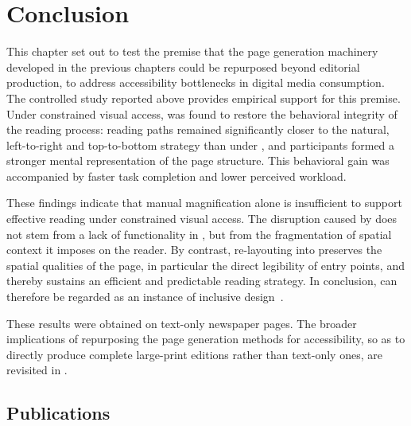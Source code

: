 










\section{Conclusion}

This chapter set out to test the premise that the page generation machinery developed in the previous chapters could be repurposed beyond editorial production, to address accessibility bottlenecks in digital media consumption. The controlled study reported above provides empirical support for this premise. Under constrained visual access, \condtwonot was found to restore the behavioral integrity of the reading process: reading paths remained significantly closer to the natural, left-to-right and top-to-bottom strategy than under \condonenot, and participants formed a stronger mental representation of the page structure. This behavioral gain was accompanied by faster task completion and lower perceived workload. 

These findings indicate that manual magnification alone is insufficient to support effective reading under constrained visual access. The disruption caused by \condonenot does not stem from a lack of functionality in \panzoom, but from the fragmentation of spatial context it imposes on the reader. By contrast, re-layouting into \condtwonot preserves the spatial qualities of the page, in particular the direct legibility of entry points, and thereby sustains an efficient and predictable reading strategy. In conclusion, \condtwonot can therefore be regarded as an instance of inclusive design~\cite{langdon-inclusive-design-2014}.


These results were obtained on text-only newspaper pages. The broader implications of repurposing the page generation methods for accessibility, so as to directly produce complete large-print editions rather than text-only ones, are revisited in .

\subsection*{Publications}

